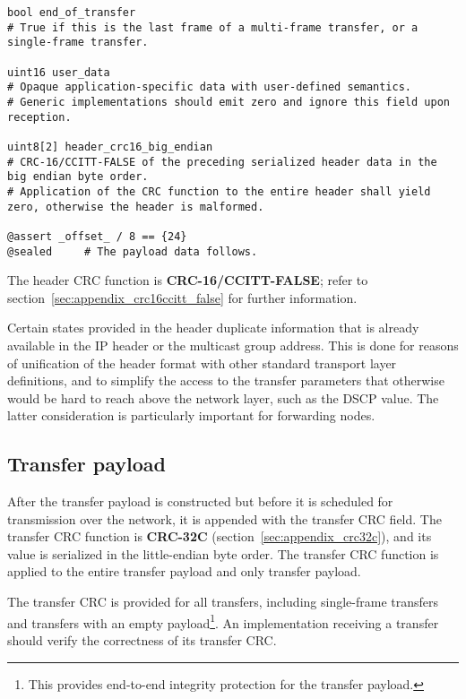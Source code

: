\begin{samepage}
\begin{verbatim}
bool end_of_transfer
# True if this is the last frame of a multi-frame transfer, or a single-frame transfer.

uint16 user_data
# Opaque application-specific data with user-defined semantics.
# Generic implementations should emit zero and ignore this field upon reception.

uint8[2] header_crc16_big_endian
# CRC-16/CCITT-FALSE of the preceding serialized header data in the big endian byte order.
# Application of the CRC function to the entire header shall yield zero, otherwise the header is malformed.

@assert _offset_ / 8 == {24}
@sealed     # The payload data follows.
\end{verbatim}
\end{samepage}

The header CRC function is \textbf{CRC-16/CCITT-FALSE};
refer to section~\ref{sec:appendix_crc16ccitt_false} for further information.

\begin{remark}
    Certain states provided in the header duplicate information that is already available in the IP header
    or the multicast group address.
    This is done for reasons of unification of the header format with other standard transport layer definitions,
    and to simplify the access to the transfer parameters that otherwise would be hard to reach above the
    network layer, such as the DSCP value.
    The latter consideration is particularly important for forwarding nodes.
\end{remark}

\subsection{Transfer payload}

After the transfer payload is constructed but before it is scheduled for transmission over the network,
it is appended with the transfer CRC field.
The transfer CRC function is \textbf{CRC-32C} (section~\ref{sec:appendix_crc32c}),
and its value is serialized in the little-endian byte order.
The transfer CRC function is applied to the entire transfer payload and only transfer payload.

The transfer CRC is provided for all transfers,
including single-frame transfers and transfers with an empty payload\footnote{%
    This provides end-to-end integrity protection for the transfer payload.
}.
An implementation receiving a transfer should verify the correctness of its transfer CRC.

